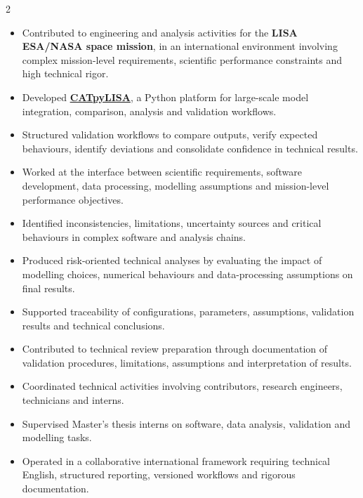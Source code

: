 \documentclass[8pt,a4paper,ragged2e,withhyper]{altacv}
\begin{document}
\begin{paracol}{2}
\begin{itemize}
\item Contributed to engineering and analysis activities for the \textbf{LISA ESA/NASA space mission}, in an international environment involving complex mission-level requirements, scientific performance constraints and high technical rigor.
\item Developed \textcolor{DarkPastelRed}{\href{https://gitlab.oca.eu/gboileau/lisa_l3_tools}{\bf CATpyLISA}}, a Python platform for large-scale model integration, comparison, analysis and validation workflows.
\item Structured validation workflows to compare outputs, verify expected behaviours, identify deviations and consolidate confidence in technical results.
\item Worked at the interface between scientific requirements, software development, data processing, modelling assumptions and mission-level performance objectives.
\item Identified inconsistencies, limitations, uncertainty sources and critical behaviours in complex software and analysis chains.
\item Produced risk-oriented technical analyses by evaluating the impact of modelling choices, numerical behaviours and data-processing assumptions on final results.
\item Supported traceability of configurations, parameters, assumptions, validation results and technical conclusions.
\item Contributed to technical review preparation through documentation of validation procedures, limitations, assumptions and interpretation of results.
\item Coordinated technical activities involving contributors, research engineers, technicians and interns.
\item Supervised Master's thesis interns on software, data analysis, validation and modelling tasks.
\item Operated in a collaborative international framework requiring technical English, structured reporting, versioned workflows and rigorous documentation.
\end{itemize}

\divider



\end{paracol}
\end{document}
